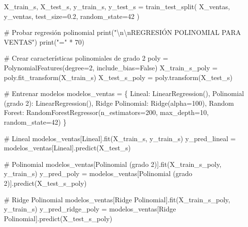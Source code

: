 \documentclass[
  doc,
  floatsintext,
  longtable,
  a4paper,
  nolmodern,
  notxfonts,
  notimes,
  12pt,
  colorlinks=true,linkcolor=blue,citecolor=blue,urlcolor=blue]{apa7}
\newenvironment{Shaded}{\begin{snugshade}}{\end{snugshade}}
\newcommand{\BuiltInTok}[1]{\textcolor[rgb]{0.00,0.23,0.31}{#1}}
\newcommand{\CharTok}[1]{\textcolor[rgb]{0.13,0.47,0.30}{#1}}
\newcommand{\CommentTok}[1]{\textcolor[rgb]{0.37,0.37,0.37}{#1}}
\newcommand{\DecValTok}[1]{\textcolor[rgb]{0.68,0.00,0.00}{#1}}
\newcommand{\FloatTok}[1]{\textcolor[rgb]{0.68,0.00,0.00}{#1}}
\newcommand{\NormalTok}[1]{\textcolor[rgb]{0.00,0.23,0.31}{#1}}
\newcommand{\OperatorTok}[1]{\textcolor[rgb]{0.37,0.37,0.37}{#1}}
\newcommand{\StringTok}[1]{\textcolor[rgb]{0.13,0.47,0.30}{#1}}
\newcommand{\VariableTok}[1]{\textcolor[rgb]{0.07,0.07,0.07}{#1}}
\begin{document}
\begin{Shaded}
\begin{Highlighting}[]
\NormalTok{X\_train\_s, X\_test\_s, y\_train\_s, y\_test\_s }\OperatorTok{=}\NormalTok{ train\_test\_split(}
\NormalTok{    X\_ventas, y\_ventas, test\_size}\OperatorTok{=}\FloatTok{0.2}\NormalTok{, random\_state}\OperatorTok{=}\DecValTok{42}
\NormalTok{)}

\CommentTok{\# Probar regresión polinomial}
\BuiltInTok{print}\NormalTok{(}\StringTok{"}\CharTok{\textbackslash{}n\textbackslash{}n}\StringTok{REGRESIÓN POLINOMIAL PARA VENTAS"}\NormalTok{)}
\BuiltInTok{print}\NormalTok{(}\StringTok{"="} \OperatorTok{*} \DecValTok{70}\NormalTok{)}

\CommentTok{\# Crear características polinomiales de grado 2}
\NormalTok{poly }\OperatorTok{=}\NormalTok{ PolynomialFeatures(degree}\OperatorTok{=}\DecValTok{2}\NormalTok{, include\_bias}\OperatorTok{=}\VariableTok{False}\NormalTok{)}
\NormalTok{X\_train\_s\_poly }\OperatorTok{=}\NormalTok{ poly.fit\_transform(X\_train\_s)}
\NormalTok{X\_test\_s\_poly }\OperatorTok{=}\NormalTok{ poly.transform(X\_test\_s)}

\CommentTok{\# Entrenar modelos}
\NormalTok{modelos\_ventas }\OperatorTok{=}\NormalTok{ \{}
    \StringTok{\textquotesingle{}Lineal\textquotesingle{}}\NormalTok{: LinearRegression(),}
    \StringTok{\textquotesingle{}Polinomial (grado 2)\textquotesingle{}}\NormalTok{: LinearRegression(),}
    \StringTok{\textquotesingle{}Ridge Polinomial\textquotesingle{}}\NormalTok{: Ridge(alpha}\OperatorTok{=}\DecValTok{100}\NormalTok{),}
    \StringTok{\textquotesingle{}Random Forest\textquotesingle{}}\NormalTok{: RandomForestRegressor(n\_estimators}\OperatorTok{=}\DecValTok{200}\NormalTok{, max\_depth}\OperatorTok{=}\DecValTok{10}\NormalTok{, random\_state}\OperatorTok{=}\DecValTok{42}\NormalTok{)}
\NormalTok{\}}

\CommentTok{\# Lineal}
\NormalTok{modelos\_ventas[}\StringTok{\textquotesingle{}Lineal\textquotesingle{}}\NormalTok{].fit(X\_train\_s, y\_train\_s)}
\NormalTok{y\_pred\_lineal }\OperatorTok{=}\NormalTok{ modelos\_ventas[}\StringTok{\textquotesingle{}Lineal\textquotesingle{}}\NormalTok{].predict(X\_test\_s)}

\CommentTok{\# Polinomial}
\NormalTok{modelos\_ventas[}\StringTok{\textquotesingle{}Polinomial (grado 2)\textquotesingle{}}\NormalTok{].fit(X\_train\_s\_poly, y\_train\_s)}
\NormalTok{y\_pred\_poly }\OperatorTok{=}\NormalTok{ modelos\_ventas[}\StringTok{\textquotesingle{}Polinomial (grado 2)\textquotesingle{}}\NormalTok{].predict(X\_test\_s\_poly)}

\CommentTok{\# Ridge Polinomial}
\NormalTok{modelos\_ventas[}\StringTok{\textquotesingle{}Ridge Polinomial\textquotesingle{}}\NormalTok{].fit(X\_train\_s\_poly, y\_train\_s)}
\NormalTok{y\_pred\_ridge\_poly }\OperatorTok{=}\NormalTok{ modelos\_ventas[}\StringTok{\textquotesingle{}Ridge Polinomial\textquotesingle{}}\NormalTok{].predict(X\_test\_s\_poly)}


\end{Highlighting}
\end{Shaded}
\end{document}
